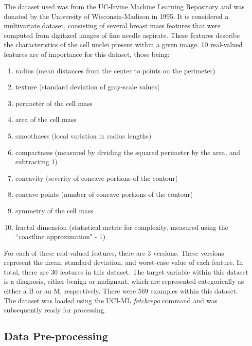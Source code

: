 \documentclass[a4paper]{article}
\begin{document}
The dataset used was from the UC-Irvine Machine Learning Repository and was donated by the University of Wisconsin-Madison in 1995. It is considered a multivariate dataset, consisting of several breast mass features that were computed from digitized images of fine needle aspirate. These features describe the characteristics of the cell nuclei present within a given image. 10 real-valued features are of importance for this dataset, those being:
\newpage
\begin{enumerate}
    \item radius (mean distances from the center to points on the perimeter)
    \item texture (standard deviation of gray-scale values)
    \item perimeter of the cell mass
    \item area of the cell mass
    \item smoothness (local variation in radius lengths)
    \item compactness (measured by dividing the squared perimeter by the area, and subtracting 1)
    \item concavity (severity of concave portions of the contour)
    \item concave points (number of concave portions of the contour)
    \item symmetry of the cell mass
    \item fractal dimension (statistical metric for complexity, measured using the ``coastline approximation" - 1)
\end{enumerate}

For each of these real-valued features, there are 3 versions. These versions represent the mean, standard deviation, and worst-case value of each feature. In total, there are 30 features in this dataset. The target variable within this dataset is a diagnosis, either benign or malignant, which are represented categorically as either a B or an M, respectively. There were 569 examples within this dataset. The dataset was loaded using the UCI-ML \textit{fetchrepo} command and was subsequently ready for processing. 

\subsection{Data Pre-processing}
\end{document}

